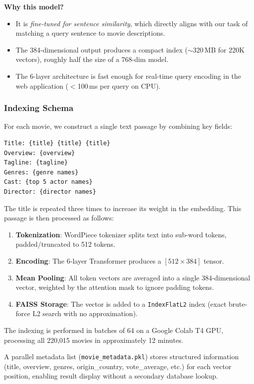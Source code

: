 \documentclass[11pt,a4paper]{article}
\begin{document}
\noindent \textbf{Why this model?}
\begin{itemize}[nosep]
  \item It is \textit{fine-tuned for sentence similarity}, which directly aligns with our task of matching a query sentence to movie descriptions.
  \item The 384-dimensional output produces a compact index ($\sim$320\,MB for 220K vectors), roughly half the size of a 768-dim model.
  \item The 6-layer architecture is fast enough for real-time query encoding in the web application ($<$100\,ms per query on CPU).
\end{itemize}

\subsubsection{Indexing Schema}

For each movie, we construct a single text passage by combining key fields:

\begin{lstlisting}
Title: {title} {title} {title}
Overview: {overview}
Tagline: {tagline}
Genres: {genre names}
Cast: {top 5 actor names}
Director: {director names}
\end{lstlisting}

\noindent The title is repeated three times to increase its weight in the embedding. This passage is then processed as follows:

\begin{enumerate}[nosep]
  \item \textbf{Tokenization}: WordPiece tokenizer splits text into sub-word tokens, padded/truncated to 512 tokens.
  \item \textbf{Encoding}: The 6-layer Transformer produces a $[512 \times 384]$ tensor.
  \item \textbf{Mean Pooling}: All token vectors are averaged into a single 384-dimensional vector, weighted by the attention mask to ignore padding tokens.
  \item \textbf{FAISS Storage}: The vector is added to a \texttt{IndexFlatL2} index (exact brute-force L2 search with no approximation).
\end{enumerate}

\noindent The indexing is performed in batches of 64 on a Google Colab T4 GPU, processing all 220,015 movies in approximately 12 minutes.

A parallel metadata list (\texttt{movie\_metadata.pkl}) stores structured information (title, overview, genres, origin\_country, vote\_average, etc.) for each vector position, enabling result display without a secondary database lookup.
\end{document}
